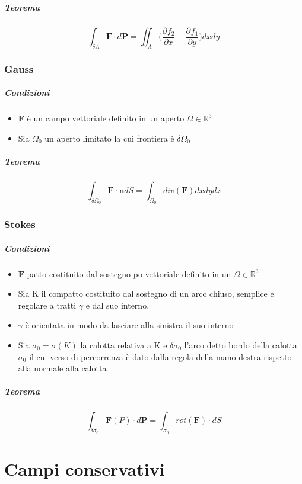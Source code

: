 \documentclass[10pt,a4paper]{report}
\newcommand{\pdv}[3]{\frac{\partial^{#2} #1}{\partial #3^{#2}}}
\begin{document}
			\subparagraph{Teorema}
			
			\[ \int_{\delta A} \mathbf{F} \cdot d \mathbf{P} = \iint_{A} \Big(\pdv{f_{2}}{}{x} - \pdv{f_{1}}{}{y}\Big) dxdy \]
			
			
			\subsubsection{Gauss}
				\subparagraph{Condizioni}
					\begin{itemize}
						\item $ \mathbf{F} $ è un campo vettoriale definito in un aperto $ \Omega \in \mathbb{R}^{3} $
						\item Sia $ \Omega_{0} $ un aperto limitato la cui frontiera è $ \delta \Omega_{0} $
					\end{itemize}
				\subparagraph{Teorema}
				\[ \int_{\delta \Omega_{0}} \mathbf{F} \cdot \mathbf{n} dS = \int_{\Omega_{0}} div(\mathbf{F}) dxdydz \]
			
			\subsubsection{Stokes}
			
				\subparagraph{Condizioni}
				\begin{itemize}
					\item $\mathbf{F}$ patto costituito dal sostegno po vettoriale definito in un $ \Omega \in \mathbb{R}^{3} $
					\item Sia K il compatto costituito dal sostegno di un arco chiuso, semplice e regolare a tratti $ \gamma $ e dal suo interno.
					\item $ \gamma $ è orientata in modo da lasciare alla sinistra il suo interno
					\item Sia $ \sigma_{0} = \sigma(K) $ la calotta relativa a K e $ \delta \sigma_{0} $ l'arco detto bordo della calotta $ \sigma_{0} $  il cui verso di percorrenza è dato dalla regola della mano destra  rispetto alla normale alla calotta
				\end{itemize}
				\subparagraph{Teorema}
				\[ \int_{\delta \sigma_{0}} \mathbf{F}(P) \cdot d \mathbf{P} = \int_{ \sigma_{0}} rot(\mathbf{F}) \cdot d S\]




	
	\section*{Campi conservativi}
	
\end{document}
